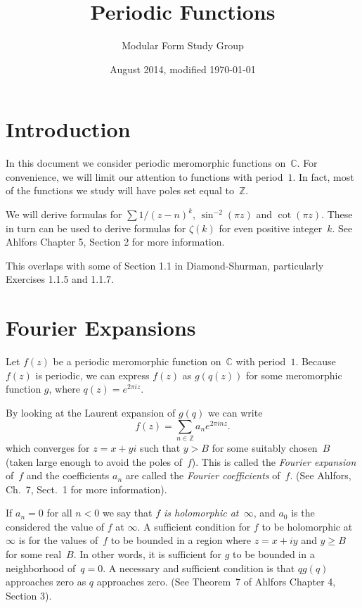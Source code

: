 \documentclass {amsart}
\theoremstyle{plain}
\theoremstyle{definition}
\theoremstyle{remark}
\newcommand{\bZ}{{\mathbb{Z}}}
\newcommand{\bC}{{\mathbb{C}}}
\begin{document}
 

\title{Periodic Functions}

\author{Modular Form Study Group}

\date{August 2014, modified \today}

\maketitle


\section {Introduction}

In this document we consider periodic meromorphic functions on~$\bC$. For convenience, we will limit our attention to functions with period~$1$.  In fact, most of the functions we study will have poles set equal to~$\bZ$.

We will derive formulas for $\sum 1/(z - n)^k$, $\sin^{-2} (\pi z)$ and $\cot (\pi z)$. 
These in turn can be used to derive formulas for $\zeta(k)$ for even positive integer~$k$. 
See Ahlfors Chapter 5, Section 2 for more information.

This overlaps with some of Section 1.1 
in Diamond-Shurman,
particularly Exercises 1.1.5 and 1.1.7.


\section {Fourier Expansions}


Let $f(z)$ be a periodic meromorphic function on~$\bC$ with period~$1$.
Because $f(z)$ is periodic, we can express $f(z)$ as $g(q(z))$ for some
meromorphic function $g$, where $q(z) = e^{2\pi i z}$.

By looking at the Laurent expansion of $g(q)$ we can write 
$$
f(z)  = \sum_{n \in \bZ} a_n e^{2\pi i n z}.
$$
which converges for $z = x + yi$ such that $y > B$ for some suitably chosen~$B$ (taken large enough to avoid the poles of~$f$).
This is called the \emph{Fourier expansion} of~$f$
and the coefficients $a_n$ are called the \emph{Fourier coefficients} of~$f$.
(See Ahlfors, Ch.~7, Sect.~1 for more information).

If $a_n = 0$ for all $n < 0$ we say that \emph{$f$ is holomorphic at~$\infty$},
and $a_0$ is the considered the value of $f$ at $\infty$.
A sufficient condition for $f$ to be holomorphic at~$\infty$
is for the values of~$f$ to be bounded in a region where $z = x + i y$ and $y \ge B$ for some
real~$B$.
In other words, it is sufficient for $g$ to be bounded in a neighborhood of~$q=0$.
A necessary and sufficient condition is that $q g(q)$ approaches zero as $q$ approaches zero.
(See Theorem~7 of Ahlfors Chapter 4, Section 3).
\end{document}
